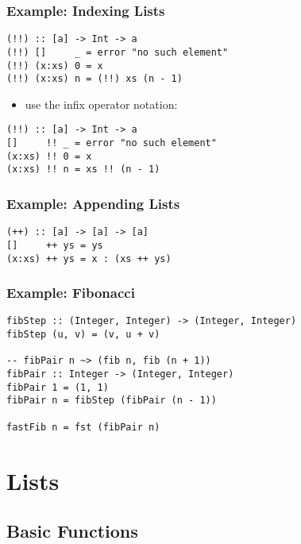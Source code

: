 \documentclass[dvipsnames]{beamer}
\theoremstyle{plain}
\begin{document}
\begin{frame}[fragile]
  \frametitle{Example: Indexing Lists}

  \begin{lstlisting}
(!!) :: [a] -> Int -> a
(!!) []     _ = error "no such element"
(!!) (x:xs) 0 = x
(!!) (x:xs) n = (!!) xs (n - 1)
  \end{lstlisting}

  \pause
  \begin{itemize}
    \item use the infix operator notation:
  \end{itemize}

  \begin{lstlisting}
(!!) :: [a] -> Int -> a
[]     !! _ = error "no such element"
(x:xs) !! 0 = x
(x:xs) !! n = xs !! (n - 1)
    \end{lstlisting}
\end{frame}

\begin{frame}[fragile]
  \frametitle{Example: Appending Lists}

  \begin{lstlisting}
(++) :: [a] -> [a] -> [a]
[]     ++ ys = ys
(x:xs) ++ ys = x : (xs ++ ys)
  \end{lstlisting}
\end{frame}

\begin{frame}[fragile]
  \frametitle{Example: Fibonacci}

  \begin{lstlisting}
fibStep :: (Integer, Integer) -> (Integer, Integer)
fibStep (u, v) = (v, u + v)

-- fibPair n ~> (fib n, fib (n + 1))
fibPair :: Integer -> (Integer, Integer)
fibPair 1 = (1, 1)
fibPair n = fibStep (fibPair (n - 1))

fastFib n = fst (fibPair n)
  \end{lstlisting}
\end{frame}

\section{Lists}

\subsection{Basic Functions}
\end{document}
